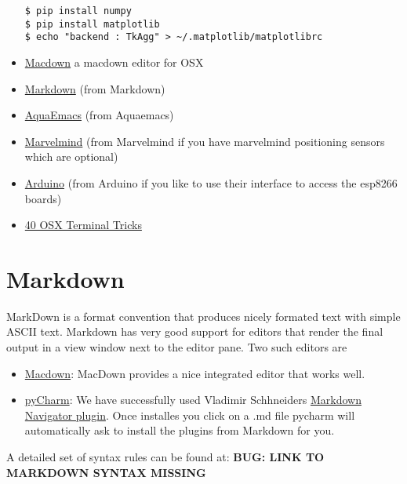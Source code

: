 \begin{itemize}
\begin{verbatim}
$ pip install numpy
$ pip install matplotlib
$ echo "backend : TkAgg" > ~/.matplotlib/matplotlibrc
\end{verbatim}
\item
  \href{https://macdown.uranusjr.com/}{Macdown} a macdown editor for OSX
\item
  \href{https://blog.ghost.org/markdown/}{Markdown} (from Markdown)
\item
  \href{http://oracc.museum.upenn.edu/doc/help/usingemacs/aquamacs/}{AquaEmacs}
  (from Aquaemacs)
\item
  \href{http://marvelmind.com/}{Marvelmind} (from Marvelmind if you have
  marvelmind positioning sensors which are optional)
\item
  \href{https://www.arduino.cc/en/guide/macOSX}{Arduino} (from Arduino
  if you like to use their interface to access the esp8266 boards)
\item
  \href{https://computers.tutsplus.com/tutorials/40-terminal-tips-and-tricks-you-never-thought-you-needed--mac-51192}{40
  OSX Terminal Tricks}
\end{itemize}

\section{Markdown}\label{markdown}

MarkDown is a format convention that produces nicely formated text with
simple ASCII text. Markdown has very good support for editors that
render the final output in a view window next to the editor pane. Two
such editors are

\begin{itemize}

\item
  \href{https://macdown.uranusjr.com/}{Macdown}: MacDown provides a nice
  integrated editor that works well.
\item
  \href{https://www.jetbrains.com/pycharm/download/download-thanks.html?platform=mac\&code=PCC}{pyCharm}:
  We have successfully used Vladimir Schhneiders
  \href{https://plugins.jetbrains.com/plugin/7896-markdown-navigator}{Markdown
  Navigator plugin}. Once installes you click on a .md file pycharm will
  automatically ask to install the plugins from Markdown for you.
\end{itemize}

A detailed set of syntax rules can be found at: \textbf{BUG: LINK TO
MARKDOWN SYNTAX MISSING}

